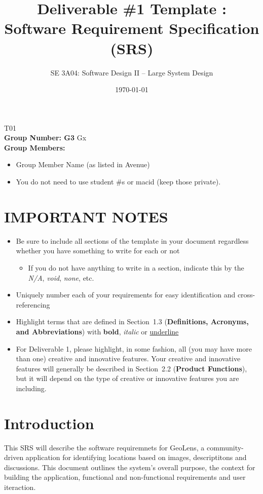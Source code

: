 \documentclass[]{article}
\title{Deliverable \#1 Template : Software Requirement Specification (SRS)}
\author{SE 3A04: Software Design II -- Large System Design}
\date{\today}
\begin{document}
\maketitle	
{} T01\\
{\bf Group Number: G3} Gx \\
{\bf Group Members:} 
\begin{itemize}
	\item Group Member Name (as listed in Avenue)
	\item You do not need to use student \#s or macid (keep those private).
\end{itemize}

\section*{IMPORTANT NOTES}
\begin{itemize}
	\item Be sure to include all sections of the template in your document regardless whether you have something to write for each or not
	\begin{itemize}
		\item If you do not have anything to write in a section, indicate this by the \emph{N/A}, \emph{void}, \emph{none}, etc.
	\end{itemize}
	\item Uniquely number each of your requirements for easy identification and cross-referencing
	\item Highlight terms that are defined in Section~1.3 (\textbf{Definitions, Acronyms, and Abbreviations}) with \textbf{bold}, \emph{italic} or \underline{underline}
	\item For Deliverable 1, please highlight, in some fashion, all (you may have more than one) creative and innovative features. Your creative and innovative features will generally be described in Section~2.2 (\textbf{Product Functions}), but it will depend on the type of creative or innovative features you are including.
\end{itemize}

\newpage
\section{Introduction}
\label{sec:introduction}
This SRS will describe the software requiremnets for GeoLens, a community-driven application for identifying
locations based on images, descriptitons and discussions. This document outlines the system's overall purpose, the context for building the application,
functional and non-functional requirements and user iteraction.
\end{document}
